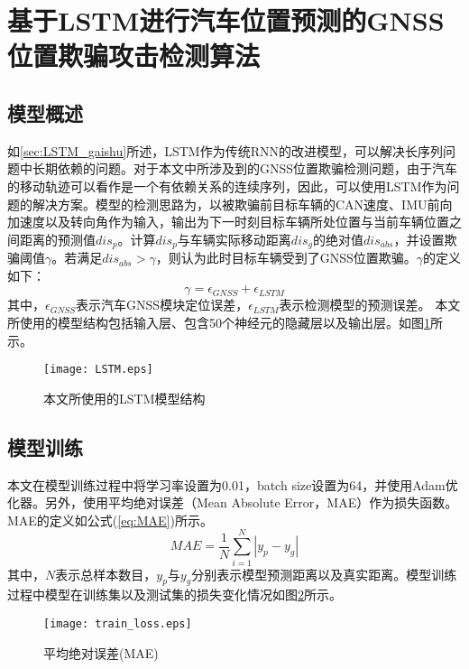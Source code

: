 \section{基于LSTM进行汽车位置预测的GNSS位置欺骗攻击检测算法}
\label{sec:chapter03}
\subsection{模型概述}
如\ref{sec:LSTM_gaishu}所述，LSTM作为传统RNN的改进模型，可以解决长序列问题中长期依赖的问题。对于本文中所涉及到的GNSS位置欺骗检测问题，由于汽车的移动轨迹可以看作是一个有依赖关系的连续序列，因此，可以使用LSTM作为问题的解决方案。模型的检测思路为，以被欺骗前目标车辆的CAN速度、IMU前向加速度以及转向角作为输入，输出为下一时刻目标车辆所处位置与当前车辆位置之间距离的预测值$dis_p$。计算$dis_p$与车辆实际移动距离$dis_g$的绝对值$dis_{abs}$，并设置欺骗阈值$\gamma$。若满足$dis_{abs}>\gamma$，则认为此时目标车辆受到了GNSS位置欺骗。$\gamma$的定义如下：
\begin{equation}
    \gamma=\epsilon_{GNSS}+\epsilon_{LSTM}
    \label{eq:gamma}
\end{equation}
其中，$\epsilon_{GNSS}$表示汽车GNSS模块定位误差，$\epsilon_{LSTM}$表示检测模型的预测误差。
本文所使用的模型结构包括输入层、包含50个神经元的隐藏层以及输出层。如图\ref{fig:my_model_arch}所示。
\begin{figure}[htbp]
    \begin{center}
        \texttt{[image: LSTM.eps]}
    \end{center}
    \caption{本文所使用的LSTM模型结构}
    \label{fig:my_model_arch}
\end{figure}

\subsection{模型训练}
\label{sec:model_train}
本文在模型训练过程中将学习率设置为0.01，batch size设置为64，并使用Adam优化器。另外，使用平均绝对误差（Mean Absolute Error，MAE）作为损失函数。MAE的定义如公式(\ref{eq:MAE})所示。
\begin{equation}
    MAE=\frac{1}{N}\sum_{i=1}^N|y_p-y_g|
    \label{eq:MAE}
\end{equation}
其中，$N$表示总样本数目，$y_p$与$y_g$分别表示模型预测距离以及真实距离。模型训练过程中模型在训练集以及测试集的损失变化情况如图\ref{fig:train_MAE_loss}所示。
\begin{figure}[htbp]
    \begin{center}
        \texttt{[image: train\_loss.eps]}
    \end{center}
    \caption{平均绝对误差(MAE)}
    \label{fig:train_MAE_loss}
\end{figure}


